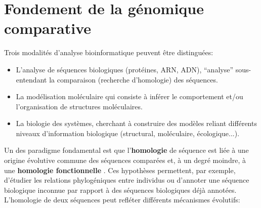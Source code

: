 \section{Fondement de la génomique comparative}\label{introchap2}
Trois modalités d'analyse bioinformatique peuvent être distinguées:
\begin{itemize}
\item L'analyse de séquences biologiques (protéines, ARN, ADN), “analyse” sous-entendant la comparaison (recherche d'homologie) des séquences. 
\item La modélisation moléculaire qui consiste à inférer le comportement et/ou l'organisation de structures moléculaires.
\item La biologie des systèmes, cherchant à construire des modèles reliant différents niveaux d'information biologique (structural, moléculaire, écologique...).
\end{itemize}
\medskip
Un des paradigme fondamental est que l'\textbf{homologie} de séquence est liée à une origine évolutive commune des séquences comparées \citep{wray1998homology} et, à un degré moindre, à une \textbf{homologie fonctionnelle} \citep{chikina2011accurate}. Ces hypothèses permettent, par exemple, d'étudier les relations phylogéniques entre individus ou d'annoter une séquence biologique inconnue par rapport à des séquences biologiques déjà annotées.\\
L'homologie de deux séquences peut refléter différents mécanismes évolutifs:
